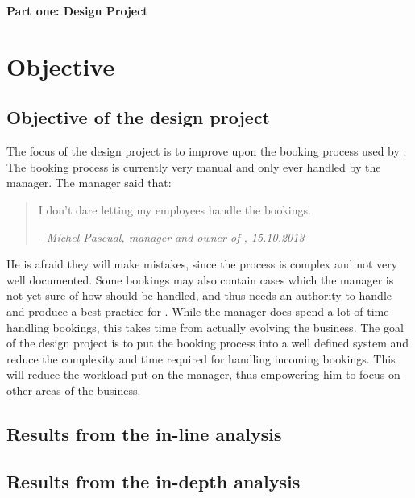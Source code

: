\textbf{\LARGE{Part one: Design Project}}

\section{Objective}

\subsection{Objective of the design project}
The focus of the design project is to improve upon the booking process used by 
\gomonkey. The booking process is currently very manual and only ever handled by 
the manager. The manager said that: 

\begin{quotation}
I don't dare letting my employees handle the bookings.

\em - Michel Pascual, manager and owner of \gomonkey, 15.10.2013
\end{quotation}

He is afraid they will make mistakes, since the process is complex and not very 
well documented. Some bookings may also contain cases which the manager is not 
yet sure of how should be handled, and thus needs an authority to handle and  
produce a best practice for \gomonkey. While the manager does spend a lot of
time handling bookings, this takes time from actually evolving the business.
The goal of the design project is to put the booking process into a 
well defined system and reduce the complexity and time required for handling
incoming bookings. This will reduce the workload put on the manager, thus 
empowering him to focus on other areas of the business.

\subsection{Results from the in-line analysis}

\subsection{Results from the in-depth analysis}

